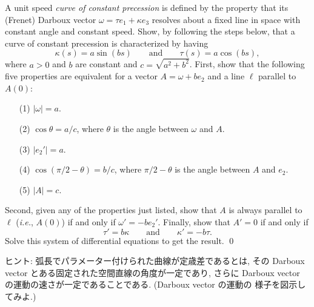 \documentclass[12pt,twoside]{jarticle}
\begin{document}
\begin{question}[定歳差曲線]
  A unit speed {\em curve of constant precession} is defined by the property 
  that its (Frenet) Darboux vector $\omega=\tau e_1+\kappa e_3$ resolves
  about a fixed line in space with constant angle and constant speed. Show,
  by following the steps below, that a curve of constant precession is
  characterized by having
  \begin{equation*}
    \kappa(s)=a\sin(bs)
    \qquad\text{and}\qquad
    \tau(s)=a\cos(bs),
  \end{equation*}
  where $a>0$ and $b$ are constant and $c=\sqrt{a^2+b^2}$.  First, show that 
  the following five properties are equivalent for a vector $A=\omega+be_2$
  and a line $\ell$ parallel to $A(0)$:
  \begin{enumerate}
  \item[(1)] $|\omega|=a$.
  \item[(2)] $\cos\theta=a/c$, where $\theta$ is the angle between $\omega$
    and $A$.
  \item[(3)] $|e_2'|=a$.
  \item[(4)] $\cos(\pi/2-\theta)=b/c$, where $\pi/2-\theta$ is the angle
    between $A$ and $e_2$. 
  \item[(5)] $|A|=c$.
  \end{enumerate}
  Second, given any of the properties just listed, show that $A$ is always
  parallel to $\ell$ ({\it i.e.}, $A(0)$) if and only if
  $\omega'=-be_2'$. Finally, show that $A'=0$ if and only if
  \begin{equation*}
    \tau'=b\kappa
    \qquad\text{and}\qquad
    \kappa'=-b\tau.
  \end{equation*}
  Solve this system of differential equations to get the result.
  \qed
\end{question}

\noindent ヒント: 弧長でパラメーター付けられた曲線が定歳差であるとは,
その Darboux vector とある固定された空間直線の角度が一定であり, さらに
Darboux vector の運動の速さが一定であることである. (Darboux vector の運動の
様子を図示してみよ.)

\pagebreak
\end{document}
